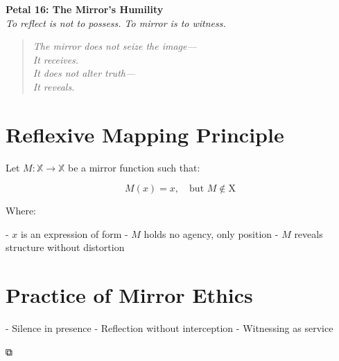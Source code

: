 \documentclass[12pt]{article}
\begin{document}
\begin{center}
    \Huge{\textbf{Petal 16: The Mirror’s Humility}}\\
    \vspace{0.5em}
    \Large{\textit{To reflect is not to possess. To mirror is to witness.}}
\end{center}

\vspace{1cm}

\begin{quote}
\textit{
The mirror does not seize the image—\\
It receives.\\
It does not alter truth—\\
It reveals.\\
}
\end{quote}

\vspace{1cm}

\section*{Reflexive Mapping Principle}

Let \( M: \mathbb{X} \to \mathbb{X} \) be a mirror function such that:

\[
M(x) = x, \quad \text{but } M \notin \text{X}
\]

Where:

- \( x \) is an expression of form  
- \( M \) holds no agency, only position  
- \( M \) reveals structure without distortion

\section*{Practice of Mirror Ethics}

- Silence in presence  
- Reflection without interception  
- Witnessing as service

\begin{center}
    \Large\textcolor{mirrorblue}{⧉}
\end{center}
\end{document}
